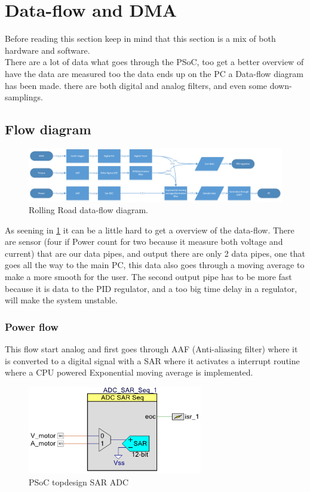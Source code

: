 \newpage
\section{Data-flow and DMA}

Before reading this section keep in mind that this section is a mix of both hardware and software.\\
There are a lot of data what goes through the PSoC, too get a better overview of have the data are measured too the data ends up on the PC a Data-flow diagram has been made. there are both digital and analog filters, and even some down-samplings.

\subsection{Flow diagram}

\begin{figure}[H]
	\centering
	\includegraphics [width=6in]{Software/Pictures/data-flow.png}
	\caption{Rolling Road data-flow diagram.}
	\label{fig:data_flow_diagram}
\end{figure}

As seening in \ref{fig:data_flow_diagram} it can be a little hard to get a overview of the data-flow. There are sensor (four if Power count for two because it measure both voltage and current) that are our data pipes, and output there are only 2 data pipes, one that goes all the way to the main PC, this data also goes through a moving average to make a more smooth for the user. The second output pipe has to be more fast because it is data to the PID regulator, and a too big time delay in a regulator, will make the system unstable.    

\subsubsection{Power flow}  

This flow start analog and first goes through AAF (Anti-aliasing filter) where it is converted to a digital signal with a SAR where it activates a interrupt routine where a CPU powered Exponential moving average is implemented.     

\begin{figure}[H]
	\centering
	\includegraphics [width=3in]{Software/Pictures/ADC_Sar_topdesign.PNG}
	\caption{PSoC topdesign SAR ADC}
	\label{fig:ADC_SAR_topdesign}
\end{figure}

